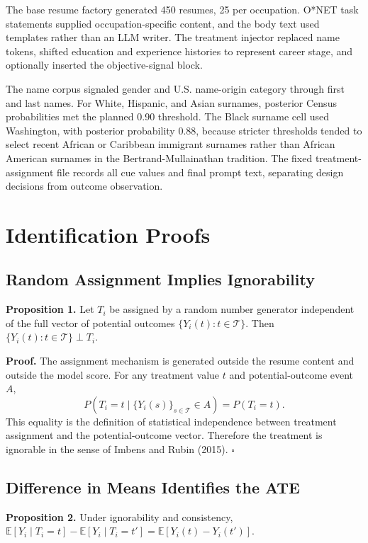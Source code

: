 \documentclass[10pt,twocolumn,letterpaper]{article}
\begin{document}
The base resume factory generated 450 resumes, 25 per occupation. O*NET task statements supplied occupation-specific content, and the body text used templates rather than an LLM writer. The treatment injector replaced name tokens, shifted education and experience histories to represent career stage, and optionally inserted the objective-signal block.

The name corpus signaled gender and U.S. name-origin category through first and last names. For White, Hispanic, and Asian surnames, posterior Census probabilities met the planned 0.90 threshold. The Black surname cell used Washington, with posterior probability 0.88, because stricter thresholds tended to select recent African or Caribbean immigrant surnames rather than African American surnames in the Bertrand-Mullainathan tradition. The fixed treatment-assignment file records all cue values and final prompt text, separating design decisions from outcome observation.

\section{Identification Proofs}
\label{app:proofs}

\subsection{Random Assignment Implies Ignorability}

\textbf{Proposition 1.} Let $T_i$ be assigned by a random number generator independent of the full vector of potential outcomes $\{Y_i(t):t \in \mathcal{T}\}$. Then $\{Y_i(t):t \in \mathcal{T}\} \perp T_i$.

\textbf{Proof.} The assignment mechanism is generated outside the resume content and outside the model score. For any treatment value $t$ and potential-outcome event $A$,
\[
P(T_i=t \mid \{Y_i(s)\}_{s\in\mathcal{T}} \in A)=P(T_i=t).
\]
This equality is the definition of statistical independence between treatment assignment and the potential-outcome vector. Therefore the treatment is ignorable in the sense of Imbens and Rubin (2015). \hfill $\square$

\subsection{Difference in Means Identifies the ATE}

\textbf{Proposition 2.} Under ignorability and consistency, $\mathbb{E}[Y_i\mid T_i=t]-\mathbb{E}[Y_i\mid T_i=t'] = \mathbb{E}[Y_i(t)-Y_i(t')]$.
\end{document}
